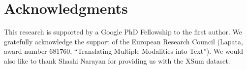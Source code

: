 \documentclass[11pt,a4paper]{article}
\begin{document}
    
    
    
    
      \section*{Acknowledgments} This research is supported by a Google
    PhD Fellowship to the first author.  We gratefully acknowledge the
    support of the European Research Council (Lapata, award number
    681760, ``Translating Multiple Modalities into Text'').  We would
    also like to thank Shashi Narayan for providing us with the XSum dataset.
    
    \newpage
    
    
    

    
    
\end{document}
